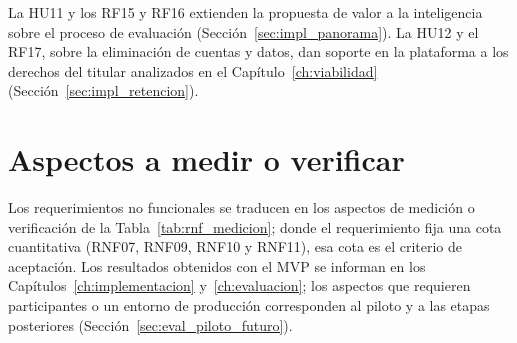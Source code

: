 La HU11 y los RF15 y RF16 extienden la propuesta de valor a la inteligencia sobre el proceso de evaluación (Sección~\ref{sec:impl_panorama}). La HU12 y el RF17, sobre la eliminación de cuentas y datos, dan soporte en la plataforma a los derechos del titular analizados en el Capítulo~\ref{ch:viabilidad} (Sección~\ref{sec:impl_retencion}).

\section{Aspectos a medir o verificar}

Los requerimientos no funcionales se traducen en los aspectos de medición o verificación de la Tabla~\ref{tab:rnf_medicion}; donde el requerimiento fija una cota cuantitativa (RNF07, RNF09, RNF10 y RNF11), esa cota es el criterio de aceptación. Los resultados obtenidos con el MVP se informan en los Capítulos~\ref{ch:implementacion} y~\ref{ch:evaluacion}; los aspectos que requieren participantes o un entorno de producción corresponden al piloto y a las etapas posteriores (Sección~\ref{sec:eval_piloto_futuro}).

